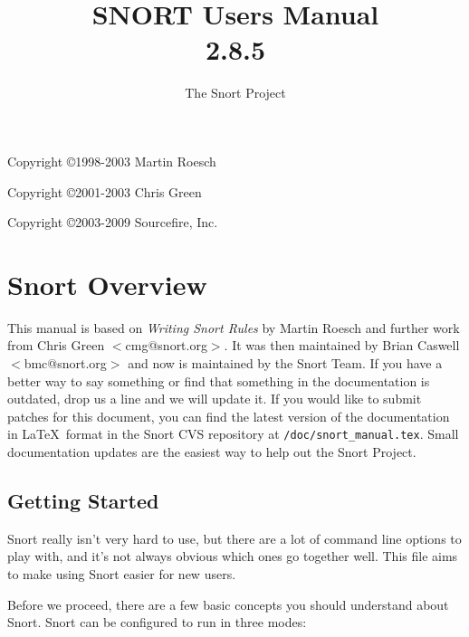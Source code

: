 \documentclass[english]{report}
\begin{document}
\title{SNORT\textsuperscript{\textregistered} Users Manual\\2.8.5}

\author{The Snort Project}

\maketitle

\newpage

Copyright \copyright 1998-2003 Martin Roesch

Copyright \copyright 2001-2003 Chris Green

Copyright \copyright 2003-2009 Sourcefire, Inc.

\tableofcontents{}

\chapter{Snort Overview}

This manual is based on \emph{Writing Snort Rules} by Martin Roesch and further
work from Chris Green $<$cmg@snort.org$>$.  It was then maintained by Brian
Caswell $<$bmc@snort.org$>$ and now is maintained by the Snort Team.  If you
have a better way to say something or find that something in the documentation
is outdated, drop us a line and we will update it.  If you would like to submit
patches for this document, you can find the latest version of the documentation
in \LaTeX\ format in the Snort CVS repository at \verb!/doc/snort_manual.tex!.
Small documentation updates are the easiest way to help out the Snort Project.

\section{Getting Started}

Snort really isn't very hard to use, but there are a lot of command line
options to play with, and it's not always obvious which ones go together well.
This file aims to make using Snort easier for new users.

Before we proceed, there are a few basic concepts you should understand about
Snort. Snort can be configured to run in three modes:
\end{document}
